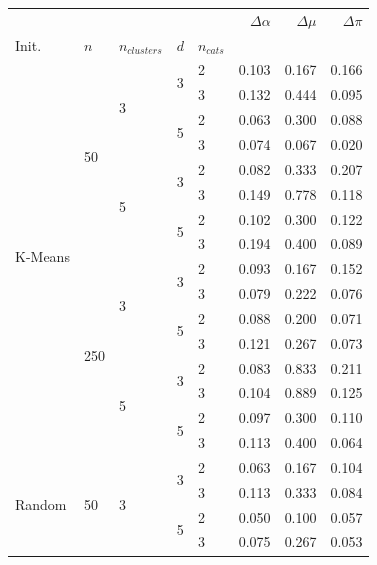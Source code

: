 \begin{table}[H]
\begin{minipage}{.48\columnwidth}
\begin{adjustbox}{width=\columnwidth}
\begin{tabular}{lllllrrr}
\toprule
 &  &  &  &  & $\Delta \alpha$ & $\Delta \mu$ & $\Delta \pi$ \\
Init. & $n$ & $n_{clusters}$ & $d$ & $n_{cats}$ &  &  &  \\
\midrule
\multirow[t]{16}{*}{K-Means} & \multirow[t]{8}{*}{50} & \multirow[t]{4}{*}{3} & \multirow[t]{2}{*}{3} & 2 & 0.103 & 0.167 & 0.166 \\
 &  &  &  & 3 & 0.132 & 0.444 & 0.095 \\
\cline{4-8}
 &  &  & \multirow[t]{2}{*}{5} & 2 & 0.063 & 0.300 & 0.088 \\
 &  &  &  & 3 & 0.074 & 0.067 & 0.020 \\
\cline{3-8} \cline{4-8}
 &  & \multirow[t]{4}{*}{5} & \multirow[t]{2}{*}{3} & 2 & 0.082 & 0.333 & 0.207 \\
 &  &  &  & 3 & 0.149 & 0.778 & 0.118 \\
\cline{4-8}
 &  &  & \multirow[t]{2}{*}{5} & 2 & 0.102 & 0.300 & 0.122 \\
 &  &  &  & 3 & 0.194 & 0.400 & 0.089 \\
\cline{2-8} \cline{3-8} \cline{4-8}
 & \multirow[t]{8}{*}{250} & \multirow[t]{4}{*}{3} & \multirow[t]{2}{*}{3} & 2 & 0.093 & 0.167 & 0.152 \\
 &  &  &  & 3 & 0.079 & 0.222 & 0.076 \\
\cline{4-8}
 &  &  & \multirow[t]{2}{*}{5} & 2 & 0.088 & 0.200 & 0.071 \\
 &  &  &  & 3 & 0.121 & 0.267 & 0.073 \\
\cline{3-8} \cline{4-8}
 &  & \multirow[t]{4}{*}{5} & \multirow[t]{2}{*}{3} & 2 & 0.083 & 0.833 & 0.211 \\
 &  &  &  & 3 & 0.104 & 0.889 & 0.125 \\
\cline{4-8}
 &  &  & \multirow[t]{2}{*}{5} & 2 & 0.097 & 0.300 & 0.110 \\
 &  &  &  & 3 & 0.113 & 0.400 & 0.064 \\
\cline{1-8} \cline{2-8} \cline{3-8} \cline{4-8}
\multirow[t]{16}{*}{Random} & \multirow[t]{8}{*}{50} & \multirow[t]{4}{*}{3} & \multirow[t]{2}{*}{3} & 2 & 0.063 & 0.167 & 0.104 \\
 &  &  &  & 3 & 0.113 & 0.333 & 0.084 \\
\cline{4-8}
 &  &  & \multirow[t]{2}{*}{5} & 2 & 0.050 & 0.100 & 0.057 \\
 &  &  &  & 3 & 0.075 & 0.267 & 0.053 \\

\end{tabular}
\end{adjustbox}
\end{minipage}
\end{table}
